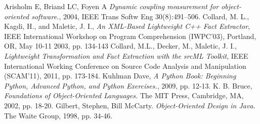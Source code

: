 \documentclass[12pt,a4paper,oneside]{report}
\begin{document}
\begin{thebibliography}{1}
Arisholm E, Briand LC, Foyen A \emph{Dynamic coupling measurement for object-oriented software.}, 2004, IEEE Trans Softw Eng 30(8):491–506.
Collard, M. L., Kagdi, H., and Maletic, J. I., \emph{An XML-Based Lightweight C++ Fact Extractor}, IEEE International Workshop on Program Comprehension (IWPC'03), Portland, OR, May 10-11 2003, pp. 134-143
Collard, M.L., Decker, M., Maletic, J. I.,  \emph{Lightweight Transformation and Fact Extraction with the srcML Toolkit}, IEEE International Working Conference on Source Code Analysis and Manipulation (SCAM'11), 2011, pp. 173-184.
Kuhlman Dave, \emph{A Python Book: Beginning Python, Advanced Python, and Python Exercises.}, 2009, pp. 12-13.
 K. B. Bruce, \emph{ Foundations of Object-Oriented Languages.} The MIT Press, Cambridge, MA, 2002, pp. 18-20.
Gilbert, Stephen, Bill McCarty. \emph{Object-Oriented Design in Java.} The Waite Group, 1998, pp. 34-46.


\end{thebibliography}
\end{document}
